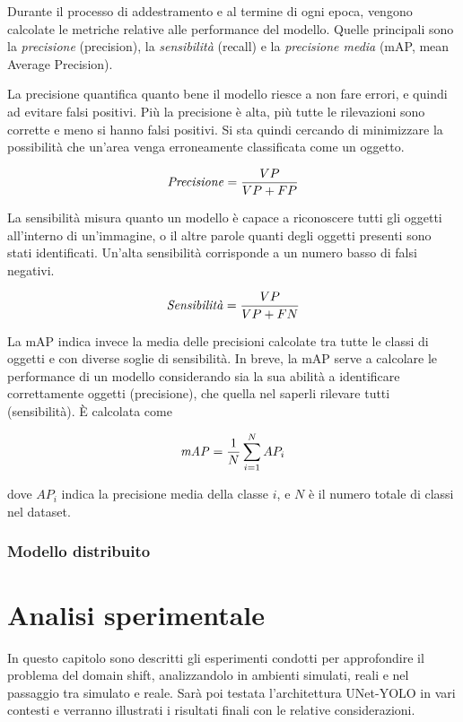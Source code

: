 \documentclass[12pt]{report}
\begin{document}
Durante il processo di addestramento e al termine di ogni epoca, vengono calcolate le metriche relative alle performance del modello. Quelle principali sono la \textit{precisione} (precision), la \textit{sensibilità} (recall) e la \textit{precisione media} (mAP, mean Average Precision).

La precisione quantifica quanto bene il modello riesce a non fare errori, e quindi ad evitare falsi positivi. Più la precisione è alta, più tutte le rilevazioni sono corrette e meno si hanno falsi positivi. Si sta quindi cercando di minimizzare la possibilità che un'area venga erroneamente classificata come un oggetto.

\[ \text{\textit{Precisione}} = \frac{VP}{VP + FP} \]

La sensibilità misura quanto un modello è capace a riconoscere tutti gli oggetti all'interno di un'immagine, o il altre parole quanti degli oggetti presenti sono stati identificati. Un'alta sensibilità corrisponde a un numero basso di falsi negativi.

\[ \text{\textit{Sensibilità}} = \frac{VP}{VP + FN} \]

La mAP indica invece la media delle precisioni calcolate tra tutte le classi di oggetti e con diverse soglie di sensibilità. In breve, la mAP serve a calcolare le performance di un modello considerando sia la sua abilità a identificare correttamente oggetti (precisione), che quella nel saperli rilevare tutti (sensibilità). È calcolata come

\[ \text{\textit{mAP}} = \frac{1}{N} \sum_{i=1}^{N} AP_i \]

dove $AP_i$ indica la precisione media della classe $i$, e $N$ è il numero totale di classi nel dataset.

\subsection{Modello distribuito}
\label{sec:addestramento_encoder_decoder}

\chapter{Analisi sperimentale}
\label{chap:analisi}

In questo capitolo sono descritti gli esperimenti condotti per approfondire il problema del domain shift, analizzandolo in ambienti simulati, reali e nel passaggio tra simulato e reale. Sarà poi testata l'architettura UNet-YOLO in vari contesti e verranno illustrati i risultati finali con le relative considerazioni.
\end{document}

